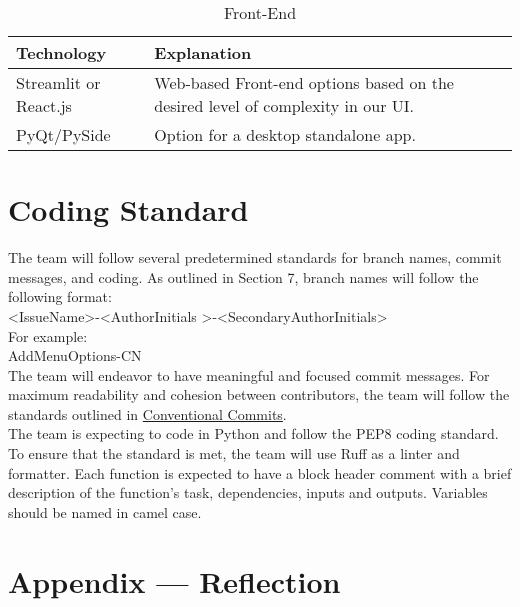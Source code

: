\documentclass{article}
\begin{document}
\begin{table}[!htbp]
\caption{Front-End} \label{TblFrontEnd}
\begin{tabularx}{\textwidth}{p{3cm}p{7cm}}
\toprule
\textbf{Technology} & \textbf{Explanation}\\
\midrule
Streamlit or React.js & Web-based Front-end options based on the desired level of complexity in our UI.\\
\addlinespace
PyQt/PySide & Option for a desktop standalone app.\\
\bottomrule
\end{tabularx}
\end{table}


\section{Coding Standard}

The team will follow several predetermined standards for branch names, commit messages, and coding. As outlined in Section 7, branch names will follow the following format:  \\

\textless Issue\textunderscore Name\textgreater-\textless AuthorInitials \textgreater-\textless SecondaryAuthorInitials\textgreater \\

For example:  \\

Add\textunderscore Menu\textunderscore Options-CN \\

The team will endeavor to have meaningful and focused commit messages. For maximum readability and cohesion between contributors, the team will follow the standards outlined in 
\href{https://www.conventionalcommits.org/en/v1.0.0/} {Conventional Commits}.  \\

The team is expecting to code in Python and follow the PEP8 coding standard. To ensure that the standard is met, the team will use Ruff as a linter and formatter. Each function is expected to have a block header comment with a brief description of the function’s task, dependencies, inputs and outputs. Variables should be named in camel case.  \\

\newpage{}

\section*{Appendix --- Reflection}
\end{document}
